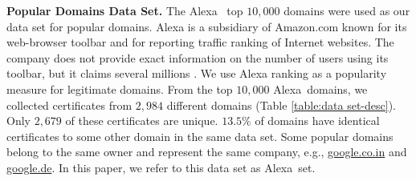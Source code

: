 \documentclass[twocolumn]{article}
\newcommand{\descr}[1]{\bigskip \noindent \textbf{#1}}
\newcommand{\Alexa}{\textsf{Alexa}}
\begin{document}
\begin{table*}[t]
\vspace{-0.2cm}
\caption{\label{tbl:features} \textbf{\small Features extracted from SSL
certificates.}}
\end{table*}

\descr{Popular Domains Data Set.}
The Alexa~\cite{alexa} top $10,000$ domains were used as our data set for popular domains. 
Alexa is a subsidiary of {\sf Amazon.com} known for its
web-browser toolbar and for reporting traffic ranking of Internet websites.
The company does not provide exact information on the number
of users using its toolbar, but it claims several millions \cite{alexa-ranking}.
We use Alexa ranking as a popularity measure for legitimate domains. From the top $10,000$ \Alexa\ domains, we collected 
certificates from $2,984$ different domains (Table \ref{table:data set-desc}). Only $2,679$ of these certificates are unique. $13.5\%$ of domains have identical certificates to some other domain in the same data set. Some popular domains belong to the same owner and represent the same company, e.g., \url{google.co.in} and \url{google.de}. In this paper, we refer to this data set as \Alexa\ set. 
\end{document}
